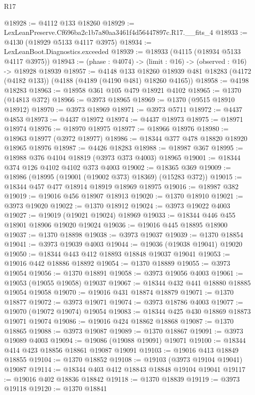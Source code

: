 \begin{lexlean}{R17}
\begin{coremodule}
@18928 := @4112 @133 @18260
@18929 := LexLeanPreserve.Cf696ba2c1b7a80aa3461f4d56447897c.R17.__fits_4
@18933 := @4130 (@18929 @5133 @4117 @3975)
@18934 := LexLeanBoot.Diagnostics.exceeded
@18939 := @18933 (@4115 (@18934 @5133 @4117 @3975))
@18943 := (phase : @4074) -> (limit : @16) -> (observed : @16) -> @18928 @18939
@18957 := @4148
    @133
    @18260
    @18939
    @481
    @18283
    (@4172 (@4182 @133))
    (@4188 (@4189 (@4190 @481) @18260 @4165))
@18958 := @4198 @18283
@18963 := @18958 @361 @105 @479 @18921 @4102
@18965 := @1370 (@14813 @372)
@18966 := @3973 @18965
@18969 := @1370 (@9515 @18910 @18912)
@18970 := @3973 @18969
@18971 := @3973 @5711
@18972 := @4437 @4853
@18973 := @4437 @18972
@18974 := @4437 @18973
@18975 := @18971 @18974
@18976 := @18970 @18975
@18977 := @18966 @18976
@18980 := @18963 @18977 (@3972 @18977)
@18986 := @18344 @377 @478 @18820 @18920 @18965 @18976
@18987 := @4426 @18283
@18988 := @18987 @367
@18995 := @18988 @376 @4104 @18819 (@3973 @373 @4003) @18965
@19001 := @18344 @374 @126 @4102 @4102 @373 @4003
@19002 := @18365 @369
@19009 := @18986 (@18995 (@19001 (@19002 @373) @18369) (@15283 @372))
@19015 := @18344 @457 @477 @18914 @18919 @18969 @18975
@19016 := @18987 @382
@19019 := @19016 @456 @18907 @18913
@19020 := @1370 @18910
@19021 := @3973 @19020
@19022 := @1370 @18912
@19024 := @3973 @19022 @4003
@19027 := @19019 (@19021 @19024) @18969
@19033 := @18344 @446 @455 @18901 @18906 @19020 @19024
@19036 := @19016 @445 @18895 @18900
@19037 := @1370 @18898
@19038 := @3973 @19037
@19039 := @1370 @18854
@19041 := @3973 @19039 @4003
@19044 := @19036 (@19038 @19041) @19020
@19050 := @18344 @443 @412 @18893 @18848 @19037 @19041
@19053 := @19016 @442 @18886 @18892
@19054 := @1370 @18889
@19055 := @3973 @19054
@19056 := @1370 @18891
@19058 := @3973 @19056 @4003
@19061 := @19053 (@19055 @19058) @19037
@19067 := @18344 @432 @441 @18880 @18885 @19054 @19058
@19070 := @19016 @431 @18874 @18879
@19071 := @1370 @18877
@19072 := @3973 @19071
@19074 := @3973 @18786 @4003
@19077 := @19070 (@19072 @19074) @19054
@19083 := @18344 @425 @430 @18869 @18873 @19071 @19074
@19086 := @19016 @424 @18862 @18868
@19087 := @1370 @18865
@19088 := @3973 @19087
@19089 := @1370 @18867
@19091 := @3973 @19089 @4003
@19094 := @19086 (@19088 @19091) @19071
@19100 := @18344 @414 @423 @18856 @18861 @19087 @19091
@19103 := @19016 @413 @18849 @18855
@19104 := @1370 @18852
@19108 := @19103 (@3973 @19104 @19041) @19087
@19114 := @18344 @403 @412 @18843 @18848 @19104 @19041
@19117 := @19016 @402 @18836 @18842
@19118 := @1370 @18839
@19119 := @3973 @19118
@19120 := @1370 @18841

\end{coremodule}
\end{lexlean}
